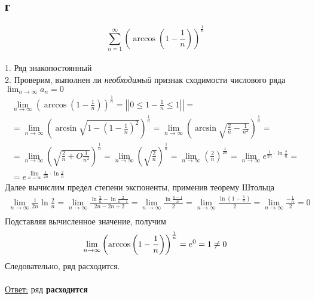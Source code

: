 \documentclass[a5paper, 10pt]{article}
\theoremstyle{definition}
\theoremstyle{plain}
\theoremstyle{remark}
\begin{document}
\subsection{г}
\begin{equation}
\sum \limits_{n = 1}^{\infty} \left(\arccos \left(1-\frac{1}{n} \right) \right)^\frac{1}{n}
\end{equation}
\\
1. Ряд знакопостоянный\\
2. Проверим, выполнен ли \textit{необходимый} признак сходимости числового ряда $ \lim_{n \to \infty} a_n = 0$
\begin{multline*}
 \lim_{n \to \infty} \left(\arccos \left(1-\frac{1}{n} \right) \right)^\frac{1}{n} = \left| \left| 0 \leq1-\frac{1}{n} \leq 1 \right| \right| =\\
= \lim_{n \to \infty}  \left(\arcsin \sqrt{1 - \left(1-\frac{1}{n} \right)^2} \right)^\frac{1}{n}=  \lim_{n \to \infty}  \left(\arcsin \sqrt{\frac{2}{n} -  \frac{1}{n^2}} \right)^\frac{1}{n} =\\ =  \lim_{n \to \infty}  \left(\sqrt{\frac{2}{n} + O\frac{1}{n^2}} \right)^\frac{1}{n} = \lim_{n \to \infty} \left(\sqrt{\frac{2}{n}} \right)^\frac{1}{n}= \lim_{n \to \infty} \left(\frac{2}{n} \right)^\frac{1}{2n}= \lim_{n \to \infty} e^{\frac{1}{2n} \cdot \ln \frac{2}{n}} = \\ =  e^{ \lim_{n \to \infty}\frac{1}{2n} \cdot \ln \frac{2}{n}}
\end{multline*}
Далее вычислим предел степени экспоненты, применив теорему Штольца
\begin{multline*}
\lim_{n \to \infty}\frac{1}{2n} \ln \frac{2}{n} =  \lim_{n \to \infty}\frac{ \ln \frac{2}{n} -  \ln \frac{2}{n - 1}}{2n - 2n + 2} = \lim_{n \to \infty}\frac{ \ln \frac{n -1}{n}}{2} =  \lim_{n \to \infty}\frac{ \ln \left( 1 - \frac{1}{n}\right)}{2} =  \lim_{n \to \infty}\frac{- \frac{1}{n}}{2} = 0\\
\end{multline*}
Подставляя вычисленное значение, получим
\begin{equation}
 \lim_{n \to \infty} \left(\arccos \left(1-\frac{1}{n} \right) \right)^\frac{1}{n} = e^0 = 1 \neq 0 \\
\end{equation}
Следовательно, ряд расходится.\\\\
\underline{Ответ:} ряд  \textbf{расходится}
\end{document}

